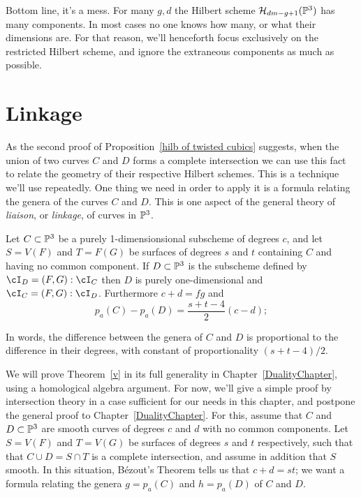 Bottom line, it's a mess. For many $g,d$ the Hilbert scheme $\cH_{dm-g+1}(\PP^3)$ has many components. In most cases no one knows how many, or what their dimensions are.
For that reason, we'll henceforth focus exclusively on the restricted Hilbert scheme, and ignore the extraneous components as much as possible.

\section{Linkage} \label{SLinkage}

As the second proof of Proposition~\ref{hilb of twisted cubics} suggests, when the union of two curves $C$ and $D$ forms a complete intersection we can use this fact to relate the geometry of their respective Hilbert schemes. This is a technique we'll use repeatedly. One thing we need in order to apply it is a formula relating the genera of the curves $C$ and $D$. This is one aspect of the general theory of \emph{liaison}, or \emph{linkage}, of curves in $\PP^3$.
\begin{theorem}\label{liaison genus formula}
 Let $C\subset \PP^3$ be a purely 1-dimensionsional subscheme of degrees $c$, and let $S = V(F)$ and $T = F(G)$ be surfaces of degrees $s$ and $t$ containing  $C$ and having  no common component. If $D \subset \PP^3$ is the subscheme defined by $\cI_D = (F,G):\cI_C$ then $D$ is purely one-dimensional and
 $\cI_C = (F,G):\cI_D$. Furthermore $c+d = fg$ and 
 \begin{equation}\label{linked genus formula}
p_a(C) - p_a(D) = \frac{s+t-4}{2}(c-d);
\end{equation}
\end{theorem}
In words, the difference between the genera of $C$ and $D$ is proportional to the difference in their degrees, with constant of proportionality $(s+t-4)/2$.

We will prove Theorem~\ref{v} in its full generality in Chapter~\ref{DualityChapter}, using a homological algebra argument. For now, we'll give a simple proof by intersection theory in a case sufficient for our needs in this chapter, and postpone the  general proof to  Chapter~\ref{DualityChapter}.
For this, assume that $C$ and $D \subset \PP^3$ are smooth curves of degrees $c$ and $d$ with no common components. Let $S = V(F)$ and $T = V(G)$ be surfaces of degrees $s$ and $t$ respectively, such that that $C \cup D = S\cap T$ is a complete intersection, and assume in addition that $S$ smooth. In this situation, B\'ezout's Theorem tells us that $c+d = st$; we want a formula relating the genera $g = p_a(C)$ and $h = p_a(D)$ of $C$ and $D$.

